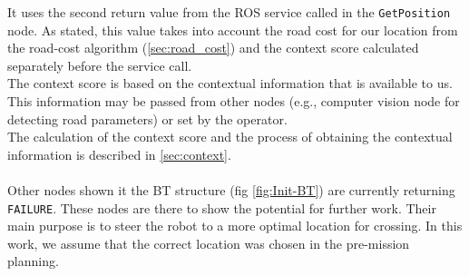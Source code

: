         It uses the second return value from the ROS service called in the \texttt{GetPosition} node. As stated, this value takes into account the road cost for our location from the road-cost algorithm (\ref{sec:road_cost}) and the context score calculated separately before the service call.\\
        The context score is based on the contextual information that is available to us. This information may be passed from other nodes (e.g., computer vision node for detecting road parameters) or set by the operator.\\
        The calculation of the context score and the process of obtaining the contextual information is described in \ref{sec:context}.\\\\

    \noindent Other nodes shown it the BT structure (fig \ref{fig:Init-BT}) are currently returning \texttt{FAILURE}. These nodes are there to show the potential for further work. Their main purpose is to steer the robot to a more optimal location for crossing. In this work, we assume that the correct location was chosen in the pre-mission planning.

